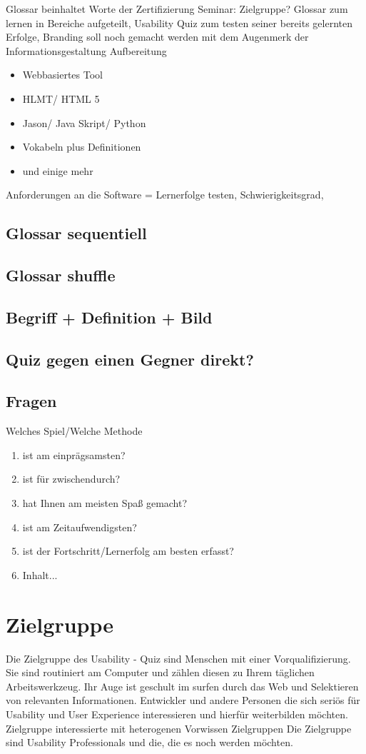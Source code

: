 \documentclass[a4paper, 12pt, twoside, BCOR=20mm, DIV=calc, abstracton, parskip=half*, toc=bibliography, toc=listof, headsepline, footsepline, headings=small, numbers=enddot]{scrreprt}
\begin{document}
	Glossar beinhaltet Worte der Zertifizierung Seminar: Zielgruppe? 
	Glossar zum lernen in Bereiche aufgeteilt, Usability Quiz zum testen seiner bereits gelernten Erfolge, 
	Branding soll noch gemacht werden mit dem Augenmerk der Informationsgestaltung Aufbereitung
	\begin{itemize}
		\item{Webbasiertes Tool}
		\item{HLMT/ HTML 5}
		\item{Jason/ Java Skript/ Python}
		\item{Vokabeln plus Definitionen}
		\item und einige mehr  
	\end{itemize}
	
	Anforderungen an die Software = Lernerfolge testen, Schwierigkeitsgrad, 
	
	\subsection{Glossar sequentiell}
	\subsection{Glossar shuffle}
	\subsection{Begriff + Definition + Bild}
	\subsection{Quiz gegen einen Gegner direkt?}
	\subsection{Fragen}
	Welches Spiel/Welche Methode
	\begin{enumerate}
		\item  ist am einprägsamsten?
		\item  ist für zwischendurch?
		\item  hat Ihnen am meisten Spaß gemacht?
		\item  ist am Zeitaufwendigsten?
		\item  ist der Fortschritt/Lernerfolg am besten erfasst?
		\item Inhalt...
	\end{enumerate}
	
	\section{Zielgruppe}
	Die Zielgruppe des Usability - Quiz sind Menschen mit einer Vorqualifizierung. Sie sind routiniert am Computer und zählen diesen zu Ihrem täglichen Arbeitswerkzeug. 
	Ihr Auge ist geschult im surfen durch das Web und Selektieren von relevanten Informationen. 
	Entwickler und andere Personen die sich seriös für Usability und User Experience interessieren und hierfür weiterbilden möchten. 
Zielgruppe interessierte mit heterogenen Vorwissen	
	Zielgruppen
	Die Zielgruppe sind Usability Professionals und die, die es noch werden möchten. 
\end{document}
